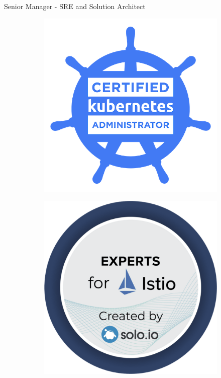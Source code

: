\documentclass[]{friggeri-cv}
\begin{document}
      {Senior Manager - SRE and Solution Architect}


\begin{figure}[h]
  \centering
  \begin{subfigure}[b]{0.1\linewidth}
    \includegraphics[width=\linewidth]{img/cka.png}
  \end{subfigure}
  \begin{subfigure}[b]{0.1\linewidth}
    \includegraphics[width=\linewidth]{img/istio-expert.png}

\end{subfigure}
\end{figure}
\end{document}
